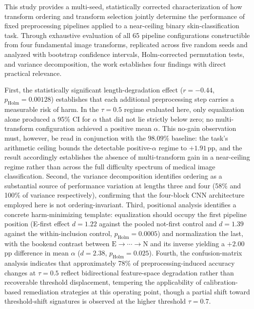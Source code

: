 \documentclass[preprint,5p,times,twocolumn]{elsarticle}
\begin{document}
This study provides a multi-seed, statistically corrected characterization of how transform ordering and transform selection jointly determine the performance of fixed preprocessing pipelines applied to a near-ceiling binary skin-classification task. Through exhaustive evaluation of all 65 pipeline configurations constructible from four fundamental image transforms, replicated across five random seeds and analyzed with bootstrap confidence intervals, Holm-corrected permutation tests, and variance decomposition, the work establishes four findings with direct practical relevance.

First, the statistically significant length-degradation effect ($r = -0.44$, $p_{\text{Holm}} = 0.00128$) establishes that each additional preprocessing step carries a measurable risk of harm. In the $\tau = 0.5$ regime evaluated here, only equalization alone produced a 95\% CI for $\alpha$ that did not lie strictly below zero; no multi-transform configuration achieved a positive mean $\alpha$. This no-gain observation must, however, be read in conjunction with the $98.09\%$ baseline: the task's arithmetic ceiling bounds the detectable positive-$\alpha$ regime to $+1.91$\,pp, and the result accordingly establishes the absence of multi-transform gain in a near-ceiling regime rather than across the full difficulty spectrum of medical image classification. Second, the variance decomposition identifies ordering as a substantial source of performance variation at lengths three and four (58\% and 100\% of variance respectively), confirming that the four-block CNN architecture employed here is not ordering-invariant. Third, positional analysis identifies a concrete harm-minimizing template: equalization should occupy the first pipeline position (E-first effect $d = 1.22$ against the pooled not-first control and $d = 1.39$ against the within-inclusion control, $p_{\text{Holm}} = 0.0005$) and normalization the last, with the bookend contrast between $\text{E} \to \cdots \to \text{N}$ and its inverse yielding a $+2.00$\,pp difference in mean $\alpha$ ($d = 2.38$, $p_{\text{Holm}} = 0.025$). Fourth, the confusion-matrix analysis indicates that approximately 78\% of preprocessing-induced accuracy changes at $\tau = 0.5$ reflect bidirectional feature-space degradation rather than recoverable threshold displacement, tempering the applicability of calibration-based remediation strategies at this operating point, though a partial shift toward threshold-shift signatures is observed at the higher threshold $\tau = 0.7$.
\end{document}
